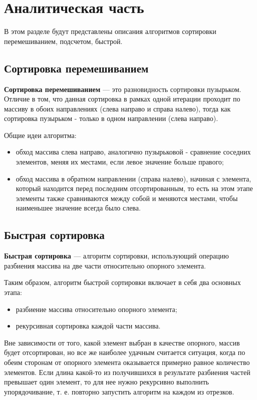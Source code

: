 \chapter{Аналитическая часть}
В этом разделе будут представлены описания алгоритмов сортировки перемешиванием, подсчетом, быстрой.

\section{Сортировка перемешиванием}

\textbf{Сортировка перемешиванием} \cite{sheyker} — это разновидность сортировки пузырьком. Отличие в том, что данная сортировка в рамках одной итерации проходит по массиву в обоих направлениях (слева направо и справа налево), тогда как сортировка пузырьком - только в одном направлении (слева направо).

Общие идеи алгоритма:
\begin{itemize}
	\item обход массива слева направо, аналогично пузырьковой - сравнение соседних элементов, меняя их местами, если левое значение больше правого;
	\item обход массива в обратном направлении (справа налево), начиная с элемента, который находится перед последним отсортированным, то есть на этом этапе элементы также сравниваются между собой и меняются местами, чтобы наименьшее значение всегда было слева.
\end{itemize}


\section{Быстрая сортировка}

\textbf{Быстрая сортировка \cite{quick}} — алгоритм сортировки, использующий операцию разбиения массива на две части относительно опорного элемента.

Таким образом, алгоритм быстрой сортировки включает в себя два основных этапа:
\begin{itemize}
	\item разбиение массива относительно опорного элемента;
	\item рекурсивная сортировка каждой части массива.
\end{itemize}

Вне зависимости от того, какой элемент выбран в качестве опорного, массив будет отсортирован, но все же наиболее удачным считается ситуация, когда по обеим сторонам от опорного элемента оказывается примерно равное количество элементов. Если длина какой-то из получившихся в результате разбиения частей превышает один элемент, то для нее нужно рекурсивно выполнить упорядочивание, т. е. повторно запустить алгоритм на каждом из отрезков.


